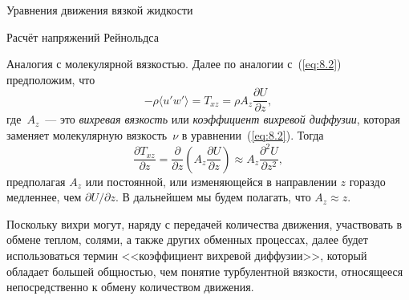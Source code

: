\begin{chapter}{Уравнения движения вязкой жидкости}
\begin{section}{Расчёт напряжений Рейнольдса}
\begin{paragraph}{Аналогия с молекулярной вязкостью.}
Далее по аналогии с~(\ref{eq:8.2}) предположим, что
\begin{equation}\label{eq:8.13}
- \rho \langle u'w'\rangle = T_{xz} = \rho A_z \frac{\partial U}{\partial z},
\end{equation}
где~$A_z$~--- это \emph{вихревая вязкость}
или \emph{коэффициент вихревой диффузии},
которая заменяет молекулярную вязкость~$\nu$ в уравнении~(\ref{eq:8.2}). Тогда
\begin{equation} 
\frac{\partial{T_{xz}}}{\partial{z}} 
 = \frac{\partial}{\partial{z}}\left(A_z\frac{\partial{U}}{\partial{z}}\right)
 \approx A_z \frac{\partial^2 U}{\partial z^2},
\end{equation}
предполагая $A_z$ или постоянной, или изменяющейся в направлении $z$ 
гораздо медленнее, чем $\partial U / \partial z$. В дальнейшем мы будем 
полагать, что $A_z \approx z$. 
%

Поскольку вихри могут, наряду с передачей количества движения, участвовать 
в обмене теплом, солями, а также других обменных процессах, далее будет 
использоваться термин <<коэффициент вихревой диффузии>>, который обладает
большей общностью, чем понятие турбулентной вязкости, относящееся 
непосредственно к обмену количеством движения.
% 


\end{paragraph}
\end{section}
\end{chapter}
